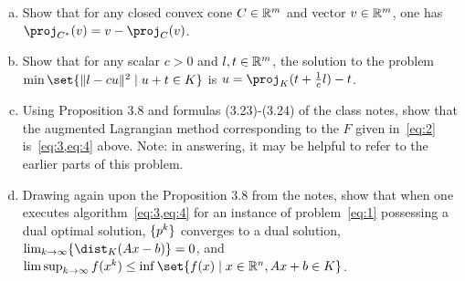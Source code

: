 \documentclass{article}
\begin{document}
\begin{problem}
\begin{enumerate}[(a)]
        \item Show that for any closed convex cone $C\in\mathbb{R}^m$ and vector $v\in\mathbb{R}^m$, one has $\proj_{C^*}(v)=v-\proj_C(v)$.
        \item Show that for any scalar $c>0$ and $l,t\in\mathbb{R}^m$, the solution to the problem $\min\set{\norm{l-cu}^2\mid u+t\in K}$ is $u=\proj_K(t+\frac{1}{c}l)-t$.
        \item Using Proposition 3.8 and formulas (3.23)-(3.24) of the class notes, show that the augmented Lagrangian method corresponding to the $F$ given in~\cref{eq:2} is~\cref{eq:3,eq:4} above. Note: in answering, it may be helpful to refer to the earlier parts of this problem.
        \item Drawing again upon the Proposition 3.8 from the notes, show that when one executes algorithm~\cref{eq:3,eq:4} for an instance of problem~\cref{eq:1} possessing a dual optimal solution, $\lbrace p^k\rbrace$ converges to a dual solution, $\lim_{k\rightarrow\infty}\braces{\dist_K(Ax-b)}=0$, and $\lim\sup_{k\rightarrow\infty}f(x^k)\leq\inf\set{f(x)\mid x\in\R^n, Ax+b\in K}$.
    \end{enumerate}
\end{problem}
\end{document}
